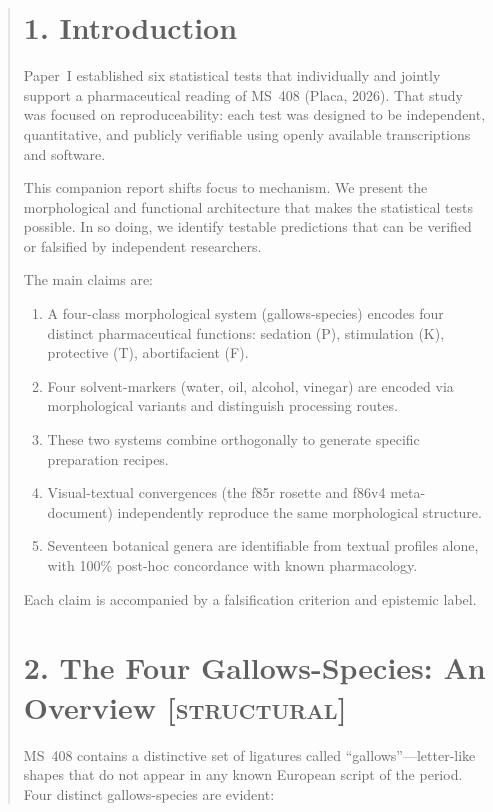 \documentclass[11pt,a4paper]{article}
\begin{document}
\begin{abstract}
\clearpage
\tableofcontents
\clearpage

\section*{1. Introduction}

Paper~I established six statistical tests that individually and jointly support a pharmaceutical reading of MS~408 (Placa, 2026). That study was focused on reproduceability: each test was designed to be independent, quantitative, and publicly verifiable using openly available transcriptions and software.

This companion report shifts focus to mechanism. We present the morphological and functional architecture that makes the statistical tests possible. In so doing, we identify testable predictions that can be verified or falsified by independent researchers.

The main claims are:
\begin{enumerate}
\item A four-class morphological system (gallows-species) encodes four distinct pharmaceutical functions: sedation (P), stimulation (K), protective (T), abortifacient (F).
\item Four solvent-markers (water, oil, alcohol, vinegar) are encoded via morphological variants and distinguish processing routes.
\item These two systems combine orthogonally to generate specific preparation recipes.
\item Visual-textual convergences (the f85r rosette and f86v4 meta-document) independently reproduce the same morphological structure.
\item Seventeen botanical genera are identifiable from textual profiles alone, with 100\% post-hoc concordance with known pharmacology.
\end{enumerate}

Each claim is accompanied by a falsification criterion and epistemic label.

\section*{2. The Four Gallows-Species: An Overview \textsc{[structural]}}

MS~408 contains a distinctive set of ligatures called ``gallows''---letter-like shapes that do not appear in any known European script of the period. Four distinct gallows-species are evident:


\end{abstract}
\end{document}
